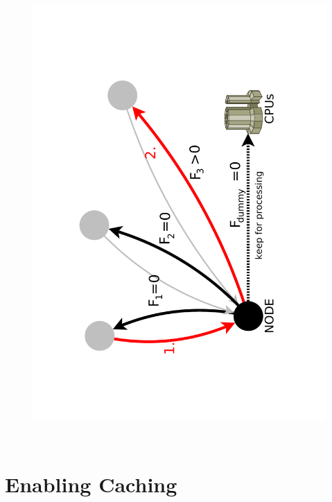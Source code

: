\documentclass{beamer}
\begin{document}
\begin{frame}
\begin{columns}[c]
\begin{figure}[h]
		\includegraphics [trim= 30mm 30mm 30mm 30mm , clip, angle =-90, width=\textwidth]{pic/handler_forwarddia.pdf}
	\label{real_network}
\end{figure} 
\end{columns}

\end{frame}

\section{Enabling Caching}
\end{document}
